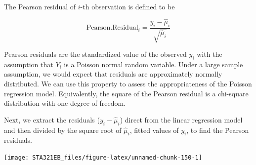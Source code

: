 \documentclass[
]{book}
\newenvironment{Shaded}{\begin{snugshade}}{\end{snugshade}}
\newcommand{\AttributeTok}[1]{\textcolor[rgb]{0.13,0.29,0.53}{#1}}
\newcommand{\DecValTok}[1]{\textcolor[rgb]{0.00,0.00,0.81}{#1}}
\newcommand{\DocumentationTok}[1]{\textcolor[rgb]{0.56,0.35,0.01}{\textbf{\textit{#1}}}}
\newcommand{\FunctionTok}[1]{\textcolor[rgb]{0.13,0.29,0.53}{\textbf{#1}}}
\newcommand{\NormalTok}[1]{#1}
\newcommand{\OtherTok}[1]{\textcolor[rgb]{0.56,0.35,0.01}{#1}}
\newcommand{\SpecialCharTok}[1]{\textcolor[rgb]{0.81,0.36,0.00}{\textbf{#1}}}
\newcommand{\StringTok}[1]{\textcolor[rgb]{0.31,0.60,0.02}{#1}}
\begin{document}
The Pearson residual of \(i\)-th observation is defined to be

\[
\text{Pearson.Residual}_i = \frac{y_i-\hat{\mu}_i}{\sqrt{\hat{\mu}_i}}
\]

Pearson residuals are the standardized value of the observed \(y_i\) with the assumption that \(Y_i\) is a Poisson normal random variable. Under a large sample assumption, we would expect that residuals are approximately normally distributed. We can use this property to assess the appropriateness of the Poisson regression model. Equivalently, the square of the Pearson residual is a chi-square distribution with one degree of freedom.

Next, we extract the residuals (\(y_i-\hat{\mu}_i\)) direct from the linear regression model and then divided by the square root of \(\hat{\mu}_i\), fitted values of \(y_i\), to find the Pearson residuals.

\begin{Shaded}
\end{Shaded}

\begin{center}\texttt{[image: STA321EB\_files/figure-latex/unnamed-chunk-150-1]} \end{center}
\end{document}
